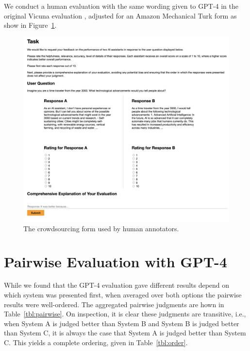 \documentclass{article}
\begin{document}
We conduct a human evaluation with the same wording given to GPT-4 in the original Vicuna evaluation \citep{vicuna2023}, adjusted for an Amazon Mechanical Turk form as show in Figure~\ref{fig:mturk}.

\begin{figure}[t]
     \centering
         \includegraphics[scale=0.48]{figures/mturk_interface.png}
        \caption{The crowdsourcing form used by human annotators.}
        \label{fig:mturk}
\end{figure} 



\section{Pairwise Evaluation with GPT-4}

While we found that the GPT-4 evaluation gave different results depend on which system was presented first, when averaged over both options the pairwise results were well-ordered. The aggregated pairwise judgments are hown in Table~\ref{tbl:pairwise}. On inspection, it is clear these judgments are transitive, i.e., when System A is judged better than System B and System B is judged better than System C, it is always the case that System A is judged better than System C. This yields a complete ordering, given in Table~\ref{tbl:order}.
\end{document}
